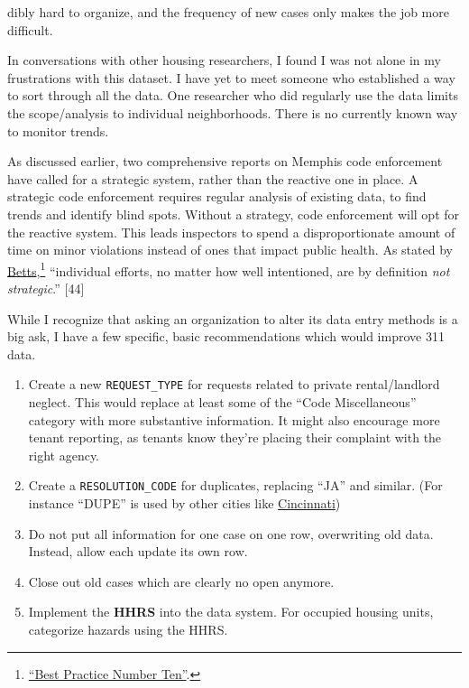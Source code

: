 \documentclass[
  openany]{book}
\providecommand{\tightlist}{%
  \setlength{\itemsep}{0pt}\setlength{\parskip}{0pt}}
\begin{document}
dibly hard to organize, and the frequency of new cases only makes the job more difficult.

In conversations with other housing researchers, I found I was not alone in my frustrations with this dataset. I have yet to meet someone who established a way to sort through all the data. One researcher who did regularly use the data limits the scope/analysis to individual neighborhoods. There is no currently known way to monitor trends.

As discussed earlier, two comprehensive reports on Memphis code enforcement have called for a strategic system, rather than the reactive one in place. A strategic code enforcement requires regular analysis of existing data, to find trends and identify blind spots. Without a strategy, code enforcement will opt for the reactive system. This leads inspectors to spend a disproportionate amount of time on minor violations instead of ones that impact public health. As stated by \protect\hyperlink{ref-betts2001}{Betts},\footnote{\protect\hyperlink{ref-betts2001}{{``Best Practice Number Ten''}}.} ``individual efforts, no matter how well intentioned, are by definition \emph{not strategic}.'' {[}44{]}

While I recognize that asking an organization to alter its data entry methods is a big ask, I have a few specific, basic recommendations which would improve 311 data.

\begin{enumerate}
\def\labelenumi{\arabic{enumi}.}
\tightlist
\item
  Create a new \texttt{REQUEST\_TYPE} for requests related to private rental/landlord neglect. This would replace at least some of the ``Code Miscellaneous'' category with more substantive information. It might also encourage more tenant reporting, as tenants know they're placing their complaint with the right agency.
\item
  Create a \texttt{RESOLUTION\_CODE} for duplicates, replacing ``JA'' and similar. (For instance ``DUPE'' is used by other cities like \href{https://data.cincinnati-oh.gov/Thriving-Neighborhoods/Code-Enforcement/cncm-znd6}{Cincinnati})
\item
  Do not put all information for one case on one row, overwriting old data. Instead, allow each update its own row.
\item
  Close out old cases which are clearly no open anymore.
\item
  Implement the \textbf{HHRS} into the data system. For occupied housing units, categorize hazards using the HHRS.
\end{enumerate}
\end{document}
